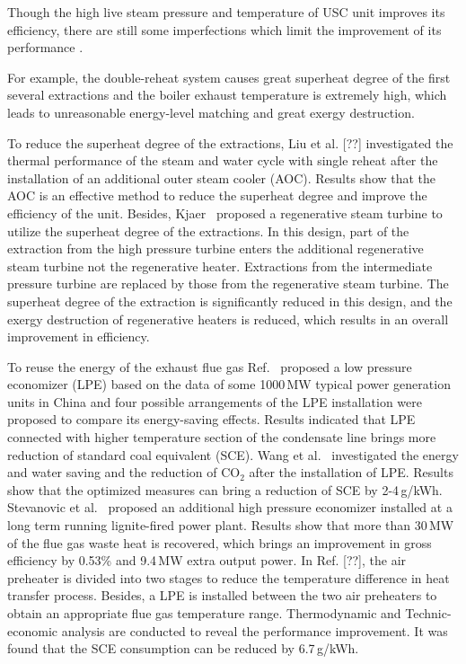\documentclass[preprint,12pt]{elsarticle}
\begin{document}
 Though the high live steam pressure and temperature of USC unit improves its efficiency, there are still some imperfections which limit the improvement of its performance . 

For example, the double-reheat system causes great superheat degree of the first several extractions and the boiler exhaust temperature is extremely high, which leads to unreasonable energy-level matching and great exergy destruction. 

To reduce the superheat degree of the extractions, Liu et al. [??] investigated the thermal performance of the steam and water cycle with single reheat after the installation of an additional outer steam cooler (AOC).
Results show that the AOC is an effective method to reduce the superheat degree and improve the efficiency of the unit.
Besides, Kjaer~\cite{Kjaer2010A} proposed a regenerative steam turbine to utilize the superheat degree of the extractions.
In this design, part of the extraction from the high pressure turbine enters the additional regenerative steam turbine not the regenerative heater.
Extractions from the intermediate pressure turbine are replaced by those from the regenerative steam turbine.
The superheat degree of the extraction is significantly reduced in this design, and the exergy destruction of regenerative heaters is reduced, which results in an overall improvement in efficiency.

To reuse the energy of the exhaust flue gas Ref.~\cite{Xu2013Techno} proposed a low pressure economizer (LPE) based on the data of some 1000\,MW typical power generation units in China and four possible arrangements of the LPE installation were proposed to compare its energy-saving effects.
Results indicated that LPE connected with higher temperature section of the condensate line brings more reduction of standard coal equivalent (SCE).
Wang et al.~\cite{Wang2012Application} investigated the energy and water saving and the reduction of CO$_2$ after the installation of LPE.
Results show that the optimized measures can bring a reduction of SCE by 2-4\,g/kWh.
Stevanovic et al.~\cite{Stevanovic2014Efficiency} proposed an additional high pressure economizer installed at a long term running lignite-fired power plant.
Results show that more than 30\,MW of the flue gas waste heat is recovered, which brings an improvement in gross efficiency by 0.53\% and 9.4\,MW extra output power.
In Ref. [??], the air preheater is divided into two stages to reduce the temperature difference in heat transfer process.
Besides, a LPE is installed between the two air preheaters to obtain an appropriate flue gas temperature range.
Thermodynamic and Technic-economic analysis are conducted to reveal the performance improvement.
It was found that the SCE consumption can be reduced by 6.7\,g/kWh. 
\end{document}
